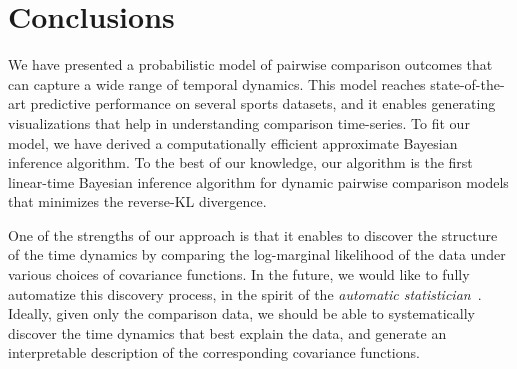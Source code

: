 \section{Conclusions}
\label{kks:sec:conclusions}

We have presented a probabilistic model of pairwise comparison outcomes that can capture a wide range of temporal dynamics.
This model reaches state-of-the-art predictive performance on several sports datasets, and it enables generating visualizations that help in understanding comparison time-series.
To fit our model, we have derived a computationally efficient approximate Bayesian inference algorithm.
To the best of our knowledge, our algorithm is the first linear-time Bayesian inference algorithm for dynamic pairwise comparison models that minimizes the reverse-KL divergence.

One of the strengths of our approach is that it enables to discover the structure of the time dynamics by comparing the log-marginal likelihood of the data under various choices of covariance functions.
In the future, we would like to fully automatize this discovery process, in the spirit of the \emph{automatic statistician}~\citep{duvenaud2014automatic}.
Ideally, given only the comparison data, we should be able to systematically discover the time dynamics that best explain the data, and generate an interpretable description of the corresponding covariance functions.
